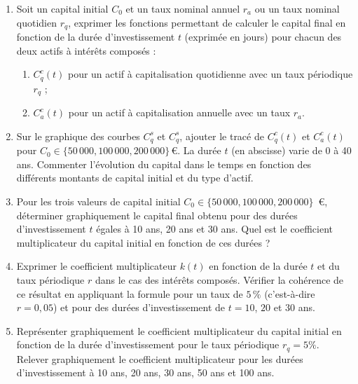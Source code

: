\documentclass{article}
\begin{document}
\begin{enumerate}[label=\textbf{Q1.\arabic*}]
\begin{enumerate}[label=\textbf{Q2.\arabic*}]
              \item Soit un capital initial \( C_0 \) et un taux nominal annuel \( r_a \) ou un taux nominal quotidien \( r_q \), exprimer les fonctions permettant de calculer le capital final en fonction de la durée d'investissement \( t \) (exprimée en jours) pour chacun des deux actifs à intérêts composés :
                    \begin{enumerate}[label=(\alph*)]
                        \item \( C^c_q(t) \) pour un actif à capitalisation quotidienne avec un taux périodique \( r_q \) ;
                        \item \( C^c_a(t) \) pour un actif à capitalisation annuelle avec un taux \( r_a \).
                    \end{enumerate}
                        
              \item Sur le graphique des courbes $C^s_q$ et $C^s_q$, ajouter le tracé de \( C^c_q(t) \) et \( C^c_a(t) \) pour \( C_0 \in \{50\,000, 100\,000, 200\,000\} \, \text{€} \). La durée \( t \) (en abscisse) varie de 0 à 40 ans. Commenter l'évolution du capital dans le temps en fonction des différents montants de capital initial et du type d'actif.
                        
              \item Pour les trois valeurs de capital initial \( C_0 \in \{50\,000, 100\,000, 200\,000\} \)~€, déterminer graphiquement le capital final obtenu pour des durées d'investissement \( t \) égales à 10 ans, 20 ans et 30 ans. Quel est le coefficient multiplicateur du capital initial en fonction de ces durées ?

              \item Exprimer le coefficient multiplicateur \( k(t) \) en fonction de la durée \( t \) et du taux périodique \( r \) dans le cas des intérêts composés. Vérifier la cohérence de ce résultat en appliquant la formule pour un taux de \( 5\,\% \) (c'est-à-dire \( r=0,05 \)) et pour des durées d'investissement de \( t=10 \), \( 20 \) et \( 30 \) ans.
              
              \item Représenter graphiquement le coefficient multiplicateur du capital initial en fonction de la durée d’investissement pour le taux périodique $r_q = 5\%$. Relever graphiquement le coefficient multiplicateur pour les durées d’investissement à 10 ans, 20 ans, 30 ans, 50 ans et 100 ans.
          \end{enumerate}
          
\end{enumerate}
\end{document}
